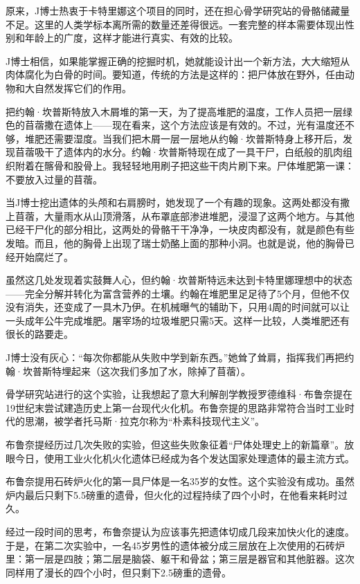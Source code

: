 \documentclass[12pt,oneside]{book}
\begin{document}
\begin{bookref}[frametitle={\cite{好好告别}}]
原来，J博士热衷于卡特里娜这个项目的同时，还在担心骨学研究站的骨骼储藏量不足。这里的人类学标本离所需的数量还差得很远。一套完整的样本需要体现出性别和年龄上的广度，这样才能进行真实、有效的比较。

J博士相信，如果能掌握正确的挖掘时机，她就能设计出一个新方法，大大缩短从肉体腐化为白骨的时间。要知道，传统的方法是这样的：把尸体放在野外，任由动物和大自然发挥它们的作用。

把约翰·坎普斯特放入木屑堆的第一天，为了提高堆肥的温度，工作人员把一层绿色的苜蓿撒在遗体上——现在看来，这个方法应该是有效的。不过，光有温度还不够，堆肥还需要湿度。当我们把木屑一层一层地从约翰·坎普斯特身上移开后，发现苜蓿吸干了遗体内的水分。约翰·坎普斯特现在成了一具干尸，白纸般的肌肉组织附着在髂骨和股骨上。我轻轻地用刷子把这些干肉片刷下来。尸体堆肥第一课：不要放入过量的苜蓿。

当J博士挖出遗体的头颅和右肩膀时，她发现了一个有趣的现象。这两处都没有撒上苜蓿，大量雨水从山顶滑落，从布罩底部渗进堆肥，浸湿了这两个地方。与其他已经干尸化的部分相比，这两处的骨骼干干净净，一块皮肉都没有，就是颜色有些发暗。而且，他的胸骨上出现了瑞士奶酪上面的那种小洞。也就是说，他的胸骨已经开始腐烂了。

虽然这几处发现着实鼓舞人心，但约翰·坎普斯特远未达到卡特里娜理想中的状态——完全分解并转化为富含营养的土壤。约翰在堆肥里足足待了5个月，但他不仅没有消失，还变成了一具木乃伊。在机械曝气的辅助下，只用4周的时间就可以让一头成年公牛完成堆肥。屠宰场的垃圾堆肥只需5天。这样一比较，人类堆肥还有很长的路要走。

J博士没有灰心：“每次你都能从失败中学到新东西。”她耸了耸肩，指挥我们再把约翰·坎普斯特埋起来（这次我们多加了水，除掉了苜蓿）。

骨学研究站进行的这个实验，让我想起了意大利解剖学教授罗德维科·布鲁奈提在19世纪末尝试建造历史上第一台现代火化机。布鲁奈提的思路非常符合当时工业时代的思潮，被学者托马斯·拉克尔称为“朴素科技现代主义”。

布鲁奈提经历过几次失败的实验，但这些失败象征着“尸体处理史上的新篇章”。放眼今日，使用工业火化机火化遗体已经成为各个发达国家处理遗体的最主流方式。

布鲁奈提用石砖炉火化的第一具尸体是一名35岁的女性。这个实验没有成功。虽然炉内最后只剩下5.5磅重的遗骨，但火化的过程持续了四个小时，在他看来耗时过久。

经过一段时间的思考，布鲁奈提认为应该事先把遗体切成几段来加快火化的速度。于是，在第二次实验中，一名45岁男性的遗体被分成三层放在上次使用的石砖炉里：第一层是四肢；第二层是脑袋、躯干和骨盆；第三层是器官和其他脏器。这次同样用了漫长的四个小时，但只剩下2.5磅重的遗骨。


\end{bookref}
\end{document}
